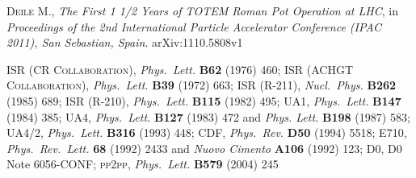 \documentclass[twocolumn,a4paper,superscriptaddress,preprintnumbers,showpacs,nofootinbib]{revtex4-1}
\def\etal{et al.}
\def\Name#1{\textsc{#1}, }
\def\REVIEW#1#2#3#4{{\it #1} {\bf #2} (#3) #4}
\begin{document}
\begin{thebibliography}{99}
	\Name{Deile M.}
	{\it The First 1 1/2 Years of TOTEM Roman Pot Operation at LHC}, in
	{\it Proceedings of the 2nd International Particle Accelerator Conference (IPAC 2011), San Sebastian, Spain}. 
	arXiv:1110.5808v1


	\Name{ISR (CR Collaboration)} \REVIEW{Phys.~Lett.}{B62}{1976}{460}; 
	\Name{ISR (ACHGT Collaboration)} \REVIEW{Phys.~Lett.}{B39}{1972}{663}; 
	\Name{ISR (R-211)} \REVIEW{Nucl.~Phys.}{B262}{1985}{689}; 
	\Name{ISR (R-210)} \REVIEW{Phys.~Lett.}{B115}{1982}{495}; 
	\Name{UA1} \REVIEW{Phys.~Lett.}{B147}{1984}{385}; 
	\Name{UA4} \REVIEW{Phys.~Lett.}{B127}{1983}{472} and \REVIEW{Phys. Lett.}{B198}{1987}{583}; 
	\Name{UA4/2} \REVIEW{Phys.~Lett.}{B316}{1993}{448}; 
	\Name{CDF} \REVIEW{Phys.~Rev.}{D50}{1994}{5518}; 
	\Name{E710} \REVIEW{Phys.~Rev.~Lett.}{68}{1992}{2433} and \REVIEW{Nuovo Cimento}{A106}{1992}{123}; 
	\Name{D0} D0 Note 6056-CONF; 
	\Name{pp2pp} \REVIEW{Phys.~Lett.}{B579}{2004}{245}

\fi

\end{thebibliography}
\end{document}
